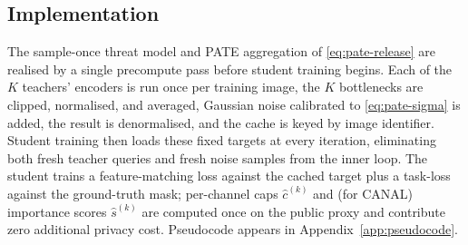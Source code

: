 \subsection{Implementation}
\label{ssec:impl}

The sample-once threat model and PATE aggregation of
\eqref{eq:pate-release} are realised by a single precompute pass
before student training begins. Each of the $K$ teachers' encoders is
run once per training image, the $K$ bottlenecks are clipped,
normalised, and averaged, Gaussian noise calibrated to
\eqref{eq:pate-sigma} is added, the result is denormalised, and the
cache is keyed by image identifier. Student training then loads these
fixed targets at every iteration, eliminating both fresh teacher
queries and fresh noise samples from the inner loop. The student
trains a feature-matching loss against the cached target plus a
task-loss against the ground-truth mask; per-channel caps
$\widehat{c}^{(k)}$ and (for CANAL) importance scores
$\widehat{s}^{(k)}$ are computed once on the public proxy and
contribute zero additional privacy cost. Pseudocode appears in
Appendix~\ref{app:pseudocode}.
